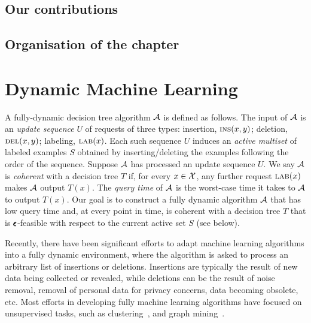 \subsection{Our contributions}
\subsection{Organisation of the chapter}

\section{Dynamic Machine Learning}

A fully-dynamic decision tree algorithm $\mathcal{A}$ is defined as follows. The input of $\mathcal{A}$ is an  \emph{update sequence} $U$ of requests of three types: insertion, $\textsc{ins}(x,y)$; deletion, $\textsc{del}(x,y)$; labeling, $\textsc{lab}(x)$. Each such sequence $U$ induces an \emph{active multiset} of labeled examples $S$ obtained by inserting/deleting the examples following the order of the sequence.
Suppose $\mathcal{A}$ has processed an update sequence $U$. We say $\mathcal{A}$ is \emph{coherent} with a decision tree $T$ if, for every $x \in \mathcal{X}$, any further request $\textsc{lab}(x)$ makes $\mathcal{A}$ output $T(x)$. The \emph{query time} of $\mathcal{A}$ is the worst-case time it takes to $\mathcal{A}$ to output $T(x)$. Our goal is to construct a fully dynamic algorithm $\mathcal{A}$ that has low query time and, at every point in time, is coherent with a decision tree $T$ that is $\pmb{\epsilon}$-feasible with respect to the current active set $S$ (see below).

Recently, there have been significant efforts to adapt machine learning algorithms into a fully dynamic environment, where the algorithm is asked to process an arbitrary list of insertions or deletions. Insertions are typically the result of new data being collected or revealed, while deletions can be the result of noise removal, removal of personal data for privacy concerns,  data becoming obsolete, etc. Most efforts in developing fully machine learning algorithms have focused on unsupervised tasks, such as clustering~\cite{Cohen-Addad2019_FullyDynamicConsistent, Henzinger2020_FullyDynamicCoresets, Bateni2021_OptimalFullyDynamic, Chan2018_FullyDynamicKCenter}, and graph mining~\cite{Bhattacharya2015_SpaceAndTimeEfficientAlgorithm, Epasto2015_EfficientDensestSubgraph, DeStefani2017_TRIESTCountingLocal}.
